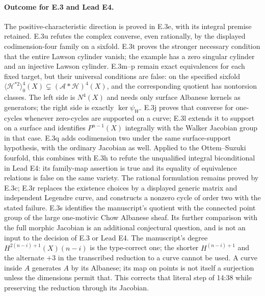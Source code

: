 \paragraph{Outcome for E.3 and Lead E4.}
The positive-characteristic direction is proved in E.3e,
with its integral premise retained. E.3u refutes the
complex converse, even rationally, by the displayed
codimension-four family on a sixfold. E.3t proves the stronger
necessary condition that the entire Lawson cylinder
vanish; the example has a zero singular cylinder and
an injective Lawson cylinder. E.3m--p remain exact
equivalences for each fixed target, but their universal
conditions are false: on the specified sixfold
$\langle\mathcal H^{*2}\rangle_0^4(X)
\subsetneq(\mathcal A*\mathcal H)^4(X)$, and the
corresponding quotient has nontorsion classes. The left
side is $N^4(X)$ and needs only surface Albanese kernels
as generators; the right side is exactly $\ker\psi_W$.
E.3j proves that converse for one-cycles whenever zero-cycles are
supported on a curve; E.3l extends it to support on a surface
and identifies $P^{n-1}(X)$ integrally with the Walker Jacobian
group in that case. E.3q adds codimension two under the same
surface-support hypothesis, with the ordinary Jacobian as well.
Applied to the Ottem--Suzuki fourfold,
this combines with E.3h to refute the unqualified integral
biconditional in Lead E4: its family-map assertion is true and
its equality of equivalence relations is false on the same
variety. The rational formulation remains proved by E.3c;
E.3r replaces the existence choices by a displayed generic
matrix and independent Legendre curve, and constructs a
nonzero cycle of order two with the stated failure.
E.3s identifies the manuscript's quotient with the connected
point group of the large one-motivic Chow Albanese sheaf.
Its further comparison with the full morphic Jacobian is
an additional conjectural question, and is not an input
to the decision of E.3 or Lead E4.
The manuscript's degree
$H^{2(n-i)+1}(X)(n-i)$ is the type-correct one; the shorter
$H^{(n-i)+1}$ and the alternate $+3$ in the transcribed reduction
to a curve cannot be used. A curve inside $A$ generates $A$ by
its Albanese; its map on points is not itself a surjection unless
the dimensions permit that. This corrects that literal step of
14:38 while preserving the reduction through its Jacobian.
